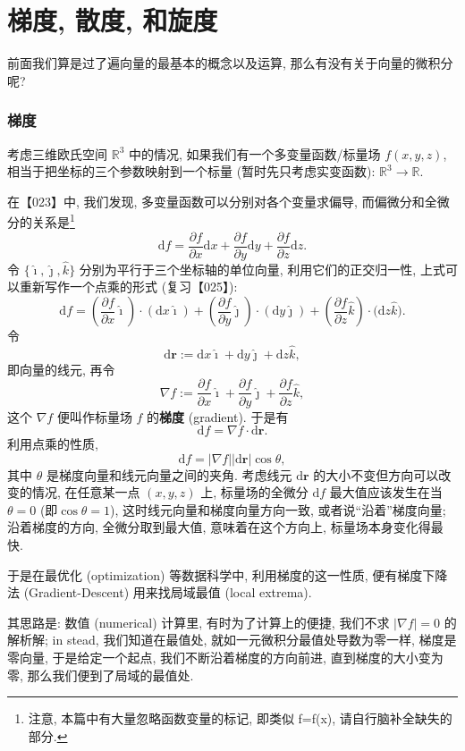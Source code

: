 \section{梯度, 散度,
和旋度}

前面我们算是过了遍向量的最基本的概念以及运算,
那么有没有关于向量的微积分呢?

\subsubsection{梯度}

考虑三维欧氏空间 \(\mathbb{R}^3\) 中的情况,
如果我们有一个多变量函数/标量场 \(f(x,y,z)\),
相当于把坐标的三个参数映射到一个标量 (暂时先只考虑实变函数):
\(\mathbb{R}^3\rightarrow\mathbb{R}\).

在【023】中, 我们发现, 多变量函数可以分别对各个变量求偏导,
而偏微分和全微分的关系是\footnote{注意, 本篇中有大量忽略函数变量的标记,
  即类似 f=f(x), 请自行脑补全缺失的部分.} \[
\mathrm{d}f=\frac{\partial f}{\partial x}\mathrm{d}x+\frac{\partial f}{\partial y}\mathrm{d}y+\frac{\partial f}{\partial z}\mathrm{d}z.
\] 令 \(\{\hat{\imath},\hat{\jmath},\hat{k}\}\)
分别为平行于三个坐标轴的单位向量, 利用它们的正交归一性,
上式可以重新写作一个点乘的形式 (复习【025】): \[
\mathrm{d}f=\left(\frac{\partial f}{\partial x}\hat{\imath}\right)\cdot\left(\mathrm{d}x\hat{\imath}\right)+\left(\frac{\partial f}{\partial y}\hat{\jmath}\right)\cdot\left(\mathrm{d}y\hat{\jmath}\right)+\left(\frac{\partial f}{\partial z}\hat{k}\right)\cdot\big(\mathrm{d}z\hat{k}\big).
\] 令 \[
\mathrm{d}\boldsymbol{r}:=\mathrm{d}x\hat{\imath}+\mathrm{d}y\hat{\jmath}+\mathrm{d}z\hat{k},
\] 即向量的线元, 再令 \[
\boxed{\nabla f:=\frac{\partial f}{\partial x}\hat{\imath}+\frac{\partial f}{\partial y}\hat{\jmath}+\frac{\partial f}{\partial z}\hat{k},}
\] 这个 \(\nabla f\) 便叫作标量场 \(f\) 的\textbf{梯度} (gradient).
于是有 \[
\mathrm{d}f=\nabla f\cdot \mathrm{d}\boldsymbol{r}.
\] 利用点乘的性质, \[
\mathrm{d}f=|\nabla f||\mathrm{d}\boldsymbol{r}|\cos\theta,
\] 其中 \(\theta\) 是梯度向量和线元向量之间的夹角. 考虑线元
\(\mathrm{d}\boldsymbol{r}\) 的大小不变但方向可以改变的情况,
在任意某一点 \((x,y,z)\) 上, 标量场的全微分 \(\mathrm{d}f\)
最大值应该发生在当 \(\theta=0\) (即\(\cos\theta=1\)),
这时线元向量和梯度向量方向一致, 或者说``沿着''梯度向量; 沿着梯度的方向,
全微分取到最大值, 意味着在这个方向上, 标量场本身变化得最快.

\begin{newquote}
于是在最优化 (optimization) 等数据科学中, 利用梯度的这一性质,
便有梯度下降法 (Gradient-Descent) 用来找局域最值 (local extrema).

其思路是: 数值 (numerical) 计算里, 有时为了计算上的便捷, 我们不求
\(|\nabla f|=0\) 的解析解; in stead, 我们知道在最值处,
就如一元微积分最值处导数为零一样, 梯度是零向量, 于是给定一个起点,
我们不断沿着梯度的方向前进, 直到梯度的大小变为零,
那么我们便到了局域的最值处.
\end{newquote}

